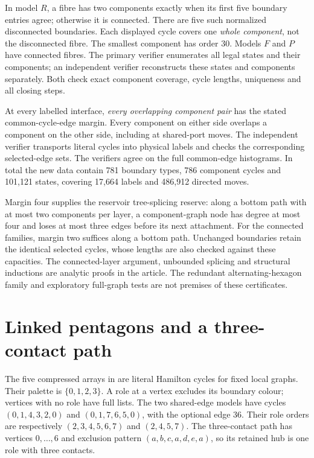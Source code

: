 \documentclass[11pt]{article}
\numberwithin{equation}{section}
\numberwithin{table}{section}
\begin{document}
In model $R$, a fibre has two components exactly when its first five
boundary entries agree; otherwise it is connected. There are five such
normalized disconnected boundaries. Each displayed cycle covers one
\emph{whole component}, not the disconnected fibre. The smallest
component has order $30$. Models $F$ and $P$ have connected fibres.
The primary verifier enumerates all legal states and their components; an
independent verifier reconstructs these states and components separately.
Both check exact component coverage, cycle lengths, uniqueness and all
closing steps.

At every labelled interface, \emph{every overlapping component pair}
has the stated common-cycle-edge margin. Every component on either
side overlaps a component on the other side, including at shared-port
moves. The independent verifier transports literal cycles into physical
labels and checks the corresponding selected-edge sets.
The verifiers agree on the full common-edge histograms. In total the new data
contain 781 boundary types, 786 component cycles and 101,121 states,
covering 17,664 labels
and 486,912 directed moves.

Margin four supplies the reservoir tree-splicing reserve: along a bottom
path with at most two components per layer, a component-graph node has degree
at most four and loses at most three edges before its next attachment.
For the connected families, margin two suffices along a bottom path.
Unchanged boundaries retain the identical selected cycles, whose lengths
are also checked against these capacities. The connected-layer argument,
unbounded splicing and structural inductions are analytic proofs in the
article. The redundant alternating-hexagon family and exploratory
full-graph tests are not premises of these certificates.

\clearpage
\section{Linked pentagons and a three-contact path}
\label{app:extended-cycle-certificates}
The five compressed arrays in  are literal
Hamilton cycles for fixed local graphs. Their palette is $\{0,1,2,3\}$.
A role at a vertex excludes its boundary colour; vertices with no role
have full lists. The two shared-edge models have cycles
$(0,1,4,3,2,0)$ and $(0,1,7,6,5,0)$, with the optional edge $36$.
Their role orders are respectively $(2,3,4,5,6,7)$ and $(2,4,5,7)$.
The three-contact path has vertices $0,\ldots,6$ and exclusion pattern
$(a,b,c,a,d,e,a)$, so its retained hub is one role with three contacts.
\end{document}
